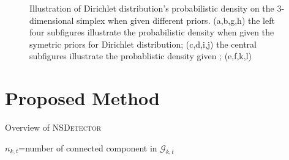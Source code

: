 \documentclass[conference,compsoc]{IEEEtran}
\begin{document}
\begin{figure}[ht]
{        }
        \hspace{1in}
        \caption{Illustration of Dirichlet distribution's probabilistic density on the 3-dimensional simplex when given different priors. (a,b,g,h) the left four subfigures illustrate the probabilistic density when given the symetric priors for Dirichlet distribution; (c,d,i,j) the central subfigures illustrate the probablistic density given ; (e,f,k,l) }
\end{figure}



\section{Proposed Method}
\begin{algorithm}
\caption{Overview of \textsc{NSDetector}}
\label{alg:overviewNSDetector}
\(n_{k,t}\)=number of connected component in \(\mathcal{G}_{k,t}\)\\
\end{algorithm}
\end{document}
